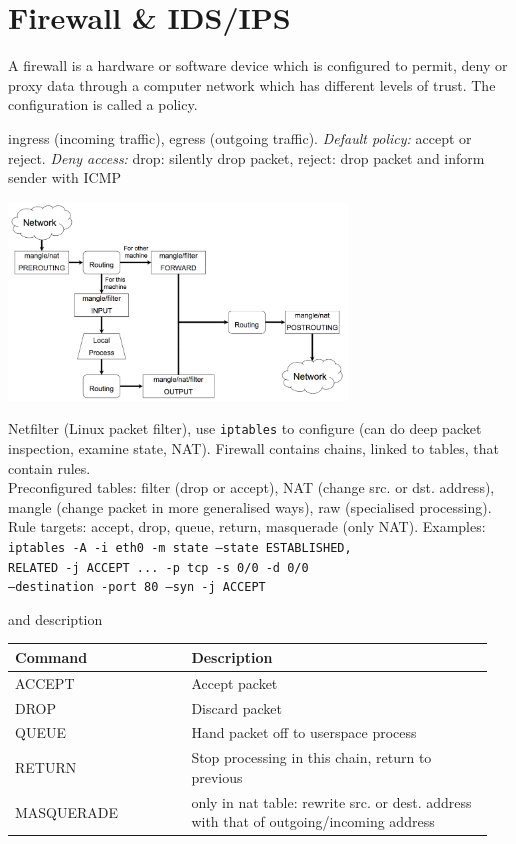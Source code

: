 \section{Firewall \& IDS/IPS}

 A firewall is a hardware or software device which is configured to permit, deny or proxy data through a computer network which has different levels of trust. The configuration is called a policy.

 ingress (incoming traffic), egress (outgoing traffic). \textit{Default policy:} accept or reject. \textit{Deny access:} drop: silently drop packet, reject: drop packet and inform sender with ICMP

\includegraphics[width=9cm]{images/netfilter}

 Netfilter (Linux packet filter), use {\tt iptables} to configure (can do deep packet inspection, examine state, NAT). Firewall contains chains, linked to tables, that contain rules. \\
Preconfigured tables: filter (drop or accept), NAT (change src. or dst. address), mangle (change packet in more generalised ways), raw (specialised processing).\\
Rule targets: accept, drop, queue, return, masquerade (only NAT). Examples: \\
{\tt iptables -A -i eth0 -m state --state ESTABLISHED,}\\
{\tt RELATED -j ACCEPT ... -p tcp -s 0/0 -d 0/0}\\
{\tt --destination -port 80 --syn -j ACCEPT}

 and description

\begin{tabular}{p{0.35\linewidth}p{0.6\linewidth}}
Command & Description \\
\hline
\hline
ACCEPT & Accept packet \\
DROP & Discard packet \\
QUEUE & Hand packet off to userspace process \\
RETURN & Stop processing in this chain, return to previous \\
MASQUERADE & only in nat table: rewrite src. or dest. address with that of outgoing/incoming address \\
\end{tabular}

